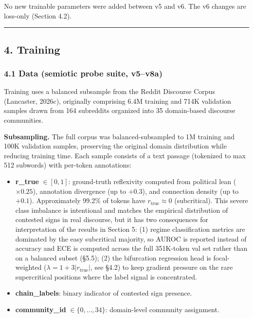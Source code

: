 \documentclass[
  11pt]{article}
\providecommand{\tightlist}{%
  \setlength{\itemsep}{0pt}\setlength{\parskip}{0pt}}
\begin{document}
No new trainable parameters were added between v5 and v6. The v6 changes
are loss-only (Section 4.2).

\begin{center}\rule{0.5\linewidth}{0.5pt}\end{center}

\subsection{4. Training}\label{training}

\subsubsection{4.1 Data (semiotic probe suite,
v5--v8a)}\label{data-semiotic-probe-suite-v5v8a}

Training uses a balanced subsample from the Reddit Discourse Corpus
(Lancaster, 2026c), originally comprising 6.4M training and 714K
validation samples drawn from 164 subreddits organized into 35
domain-based discourse communities.

\textbf{Subsampling.} The full corpus was balanced-subsampled to 1M
training and 100K validation samples, preserving the original domain
distribution while reducing training time. Each sample consists of a
text passage (tokenized to max 512 subwords) with per-token annotations:

\begin{itemize}
\tightlist
\item
  \textbf{r\_true} \(\in [0, 1]\): ground-truth reflexivity computed
  from political lean (\(\times 0.25\)), annotation divergence (up to
  \(+0.3\)), and connection density (up to \(+0.1\)). Approximately
  99.2\% of tokens have \(r_{\text{true}} \approx 0\) (subcritical).
  This severe class imbalance is intentional and matches the empirical
  distribution of contested signs in real discourse, but it has two
  consequences for interpretation of the results in Section 5: (1)
  regime classification metrics are dominated by the easy subcritical
  majority, so AUROC is reported instead of accuracy and ECE is computed
  across the full 351K-token val set rather than on a balanced subset
  (§5.5); (2) the bifurcation regression head is focal-weighted
  (\(\lambda = 1 + 3|r_{\text{true}}|\), see §4.2) to keep gradient
  pressure on the rare supercritical positions where the label signal is
  concentrated.
\item
  \textbf{chain\_labels}: binary indicator of contested sign presence.
\item
  \textbf{community\_id} \(\in \{0, \ldots, 34\}\): domain-level
  community assignment.
\end{itemize}
\end{document}

